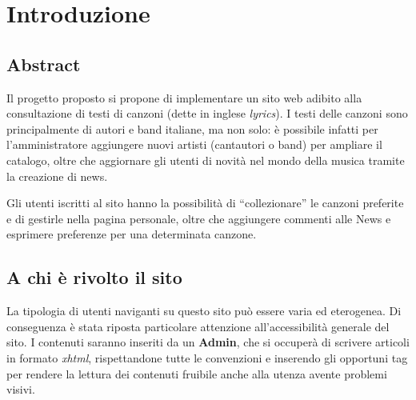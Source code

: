 \section{Introduzione}

\subsection{Abstract}
Il progetto proposto si propone di implementare un sito web adibito alla consultazione di testi di canzoni (dette in inglese \textit{lyrics}).
I testi delle canzoni sono principalmente di autori e band italiane, ma non solo: \`e possibile infatti per l'amministratore aggiungere nuovi artisti (cantautori o band) per ampliare il catalogo, oltre che aggiornare gli utenti di novit\`a nel mondo della musica tramite la creazione di news.

Gli utenti iscritti al sito hanno la possibilit\`a di ``collezionare'' le canzoni preferite e di gestirle nella pagina personale, oltre che aggiungere commenti alle News e esprimere preferenze per una determinata canzone.


\subsection{A chi \`e rivolto il sito}
La tipologia di utenti naviganti su questo sito pu\`o essere varia ed eterogenea. Di conseguenza \`e stata riposta particolare attenzione all'accessibilit\`a generale del sito. I contenuti saranno inseriti da un \textbf{Admin}, che si occuper\`a di scrivere articoli in formato \textit{xhtml}, rispettandone tutte le convenzioni e inserendo gli opportuni tag per rendere la lettura dei contenuti fruibile anche alla utenza avente problemi visivi.
